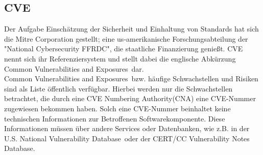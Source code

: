 \subsection{CVE} \label{sec:CVE}
Der Aufgabe Einschätzung der Sicherheit und Einhaltung von Standards hat sich die Mitre Corporation gestellt; eine us-amerikanische Forschungsabteilung der "National Cybersecurity FFRDC", die staatliche Finanzierung genießt.
CVE nennt sich ihr Referenziersystem und stellt dabei die englische Abkürzung \glqq Common Vulnerabilities and Exposures\grqq~dar.
\\
\glqq Common Vulnerabilities and Exposures\grqq~bzw. häufige Schwachstellen und Risiken sind als Liste öffentlich verfügbar.
Hierbei werden nur die Schwachstellen betrachtet, die durch eine \glqq CVE Numbering Authority\grqq (CNA) eine CVE-Nummer zugewiesen bekommen haben.\cite{}
Solch eine CVE-Nummer beinhaltet keine technischen Informationen zur Betroffenen Softwarekomponente.
Diese Informationen müssen über andere Services oder Datenbanken, wie z.B. in der \glqq U.S. National Vulnerability Database\grqq~oder der \glqq CERT/CC Vulnerability Notes Database\grqq.